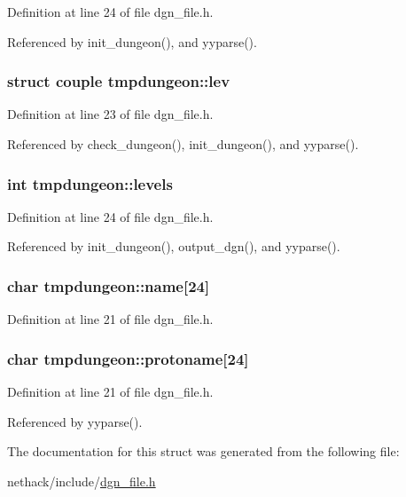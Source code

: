 Definition at line 24 of file dgn\+\_\+file.\+h.



Referenced by init\+\_\+dungeon(), and yyparse().

\hypertarget{structtmpdungeon_a8e9878596c73df9c21d64819eab65dad}{
\subsubsection[{lev}]{\setlength{\rightskip}{0pt plus 5cm}struct {\bf couple} tmpdungeon\+::lev}}\label{structtmpdungeon_a8e9878596c73df9c21d64819eab65dad}


Definition at line 23 of file dgn\+\_\+file.\+h.



Referenced by check\+\_\+dungeon(), init\+\_\+dungeon(), and yyparse().

\hypertarget{structtmpdungeon_adda9123efc4eaa10d821ff2da2b777dc}{
\subsubsection[{levels}]{\setlength{\rightskip}{0pt plus 5cm}int tmpdungeon\+::levels}}\label{structtmpdungeon_adda9123efc4eaa10d821ff2da2b777dc}


Definition at line 24 of file dgn\+\_\+file.\+h.



Referenced by init\+\_\+dungeon(), output\+\_\+dgn(), and yyparse().

\hypertarget{structtmpdungeon_aa57aa9313d02961f4d58a8e5cb08a64b}{
\subsubsection[{name}]{\setlength{\rightskip}{0pt plus 5cm}char tmpdungeon\+::name\mbox{[}24\mbox{]}}}\label{structtmpdungeon_aa57aa9313d02961f4d58a8e5cb08a64b}


Definition at line 21 of file dgn\+\_\+file.\+h.

\hypertarget{structtmpdungeon_a6c02e2269f8d30a02dfe6987aedc85d2}{
\subsubsection[{protoname}]{\setlength{\rightskip}{0pt plus 5cm}char tmpdungeon\+::protoname\mbox{[}24\mbox{]}}}\label{structtmpdungeon_a6c02e2269f8d30a02dfe6987aedc85d2}


Definition at line 21 of file dgn\+\_\+file.\+h.



Referenced by yyparse().



The documentation for this struct was generated from the following file\+:\begin{DoxyCompactItemize}
\item 
nethack/include/\hyperlink{dgn__file_8h}{dgn\+\_\+file.\+h}\end{DoxyCompactItemize}
